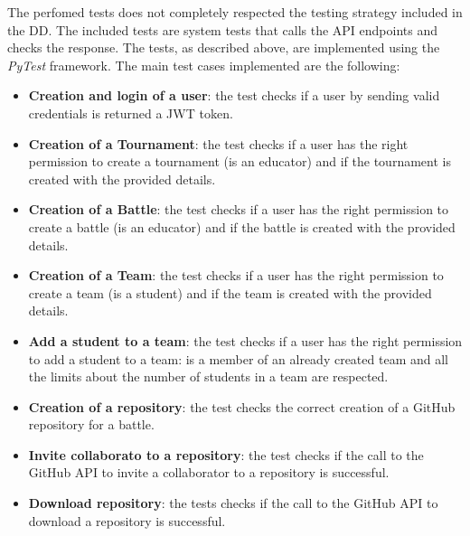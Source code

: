 The perfomed tests does not completely respected the testing strategy included in the DD. The included tests are system tests that calls the API endpoints and checks the response. The tests, as described above, are implemented using the \textit{PyTest} framework.
The main test cases implemented are the following:
\begin{itemize}
        \item \textbf{Creation and login of a user}: the test checks if a user by sending valid credentials is returned a JWT token.
        \item \textbf{Creation of a Tournament}: the test checks if a user has the right permission to create a tournament (is an educator) and if the tournament is created with the provided details.
        \item \textbf{Creation of a Battle}: the test checks if a user has the right permission to create a battle (is an educator) and if the battle is created with the provided details.
        \item \textbf{Creation of a Team}: the test checks if a user has the right permission to create a team (is a student) and if the team is created with the provided details.
        \item \textbf{Add a student to a team}: the test checks if a user has the right permission to add a student to a team: is a member of an already created team and all the limits about the number of students in a team are respected.
        \item \textbf{Creation of a repository}: the test checks the correct creation of a GitHub repository for a battle.
        \item \textbf{Invite collaborato to a repository}: the test checks if the call to the GitHub API to invite a collaborator to a repository is successful.
        \item \textbf{Download repository}: the tests checks if the call to the GitHub API to download a repository is successful.
\end{itemize}